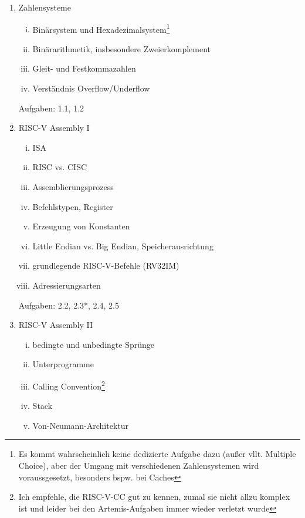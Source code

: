 \documentclass{article}
\begin{document}
\begin{enumerate}
    \item Zahlensysteme
          \begin{enumerate}[i.]
              \item Binärsystem und Hexadezimalsystem\footnote{Es kommt wahrscheinlich
                        keine dedizierte Aufgabe dazu (außer vllt. Multiple Choice), aber der Umgang
                        mit verschiedenen Zahlensystemen wird voraussgesetzt, besonders bspw. bei Caches}
              \item Binärarithmetik, insbesondere Zweierkomplement
              \item Gleit- und Festkommazahlen
              \item Verständnis Overflow/Underflow
          \end{enumerate}
          Aufgaben: 1.1, 1.2
    \item RISC-V Assembly I
          \begin{enumerate}[i.]
              \item ISA
              \item RISC vs. CISC
              \item Assemblierungsprozess
              \item Befehlstypen, Register
              \item Erzeugung von Konstanten
              \item Little Endian vs. Big Endian, Speicherausrichtung
              \item grundlegende RISC-V-Befehle (RV32IM)
              \item Adressierungsarten
          \end{enumerate}
          Aufgaben: 2.2, 2.3*, 2.4, 2.5
    \item RISC-V Assembly II
          \begin{enumerate}[i.]
              \item bedingte und unbedingte Sprünge
              \item Unterprogramme
              \item Calling Convention\footnote{Ich empfehle, die RISC-V-CC gut
                        zu kennen, zumal sie nicht allzu komplex ist und leider bei den Artemis-Aufgaben
                        immer wieder verletzt wurde}
              \item Stack
              \item Von-Neumann-Architektur
          \end{enumerate}

\end{enumerate}
\end{document}
